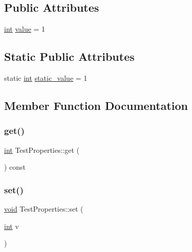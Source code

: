 \subsection*{Public Attributes}
\begin{DoxyCompactItemize}
\item 
\mbox{\hyperlink{warnings_8h_a74f207b5aa4ba51c3a2ad59b219a423b}{int}} \mbox{\hyperlink{struct_test_properties_acf6cf3f369e46d611376a5b4c6054bc2}{value}} = 1
\end{DoxyCompactItemize}
\subsection*{Static Public Attributes}
\begin{DoxyCompactItemize}
\item 
static \mbox{\hyperlink{warnings_8h_a74f207b5aa4ba51c3a2ad59b219a423b}{int}} \mbox{\hyperlink{struct_test_properties_ac583c9f9eaa6cc08aea56c6113248d59}{static\+\_\+value}} = 1
\end{DoxyCompactItemize}


\subsection{Member Function Documentation}
\mbox{\label{struct_test_properties_aacc5c9e0b4d5e4d09e9fefcf07c36db9}} 
\subsubsection{\texorpdfstring{get()}{get()}}
{\footnotesize\ttfamily \mbox{\hyperlink{warnings_8h_a74f207b5aa4ba51c3a2ad59b219a423b}{int}} Test\+Properties\+::get (\begin{DoxyParamCaption}{ }\end{DoxyParamCaption}) const\hspace{0.3cm}{\ttfamily [inline]}}

\mbox{\label{struct_test_properties_aa66f155053588d2822554fd52e55408f}} 
\subsubsection{\texorpdfstring{set()}{set()}}
{\footnotesize\ttfamily \mbox{\hyperlink{_s_d_l__opengles2__gl2ext_8h_ae5d8fa23ad07c48bb609509eae494c95}{void}} Test\+Properties\+::set (\begin{DoxyParamCaption}\item[{\mbox{\hyperlink{warnings_8h_a74f207b5aa4ba51c3a2ad59b219a423b}{int}}}]{v }\end{DoxyParamCaption})\hspace{0.3cm}{\ttfamily [inline]}}


